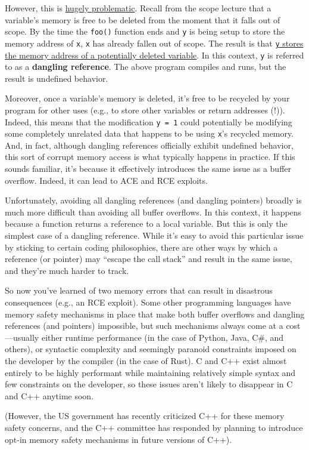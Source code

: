 \documentclass{article}
\begin{document}
However, this is \ul{hugely problematic}. Recall from the scope lecture that a variable's memory is free to be deleted from the moment that it falls out of scope. By the time the \texttt{foo()} function ends and \texttt{y} is being setup to store the memory address of \texttt{x}, \texttt{x} has already fallen out of scope. The result is that \ul{\texttt{y} stores the memory address of a potentially deleted variable}. In this context, \texttt{y} is referred to as a \textbf{dangling reference}. The above program compiles and runs, but the result is undefined behavior.

Moreover, once a variable's memory is deleted, it's free to be recycled by your program for other uses (e.g., to store other variables or return addresses (!)). Indeed, this means that the modification \texttt{y = 1} could potentially be modifying some completely unrelated data that happens to be using \texttt{x}'s recycled memory. And, in fact, although dangling references officially exhibit undefined behavior, this sort of corrupt memory access is what typically happens in practice. If this sounds familiar, it's because it effectively introduces the same issue as a buffer overflow. Indeed, it can lead to ACE and RCE exploits.

Unfortunately, avoiding all dangling references (and dangling pointers) broadly is much more difficult than avoiding all buffer overflows. In this context, it happens because a function returns a reference to a local variable. But this is only the simplest case of a dangling reference. While it's easy to avoid this particular issue by sticking to certain coding philosophies, there are other ways by which a reference (or pointer) may ``escape the call stack'' and result in the same issue, and they're much harder to track.

So now you've learned of two memory errors that can result in disastrous consequences (e.g., an RCE exploit). Some other programming languages have memory safety mechanisms in place that make both buffer overflows and dangling references (and pointers) impossible, but such mechanisms always come at a cost---usually either runtime performance (in the case of Python, Java, C\#, and others), or syntactic complexity and seemingly paranoid constraints imposed on the developer by the compiler (in the case of Rust). C and C++ exist almost entirely to be highly performant while maintaining relatively simple syntax and few constraints on the developer, so these issues aren't likely to disappear in C and C++ anytime soon.

(However, the US government has recently criticized C++ for these memory safety concerns, and the C++ committee has responded by planning to introduce opt-in memory safety mechanisms in future versions of C++).
\end{document}
